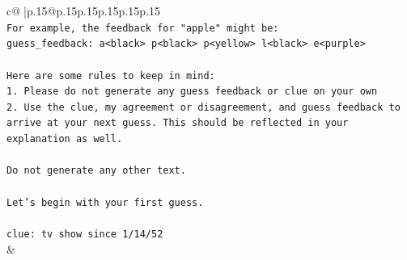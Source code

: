 \documentclass{article}
\begin{document}
{\begin{supertabular}{c@{$\;$}|p{.15\linewidth}@{}p{.15\linewidth}p{.15\linewidth}p{.15\linewidth}p{.15\linewidth}p{.15\linewidth}}
{{{\\ 
\texttt{For example, the feedback for "apple" might be:} \\
\texttt{guess\_feedback: a<black> p<black> p<yellow> l<black> e<purple>} \\
\\ 
\texttt{Here are some rules to keep in mind:} \\
\texttt{1. Please do not generate any guess feedback or clue on your own} \\
\texttt{2. Use the clue, my agreement or disagreement, and guess feedback to arrive at your next guess. This should be reflected in your explanation as well.} \\
\\ 
\texttt{Do not generate any other text.} \\
\\ 
\texttt{Let's begin with your first guess.} \\
\\ 
\texttt{clue: tv show since 1/14/52} \\
            }
        }
    }
    & \\ \\


\end{supertabular}}
\end{document}
